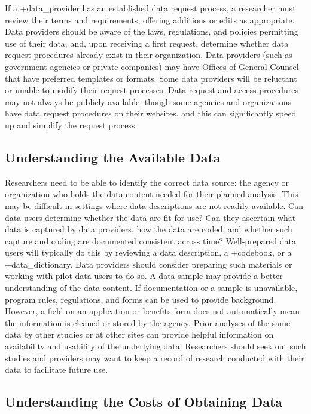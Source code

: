 \documentclass[
]{book}
\begin{document}
If a +data\_provider\textbar{} has an established data request process, a researcher must review their terms and requirements, offering additions or edits as appropriate. Data providers should be aware of the laws, regulations, and policies permitting use of their data, and, upon receiving a first request, determine whether data request procedures already exist in their organization. Data providers (such as government agencies or private companies) may have Offices of General Counsel that have preferred templates or formats. Some data providers will be reluctant or unable to modify their request processes. Data request and access procedures may not always be publicly available, though some agencies and organizations have data request procedures on their websites, and this can significantly speed up and simplify the request process.

\hypertarget{understanding-the-available-data}{%
\subsection{Understanding the Available Data}\label{understanding-the-available-data}}

Researchers need to be able to identify the correct data source: the agency or organization who holds the data content needed for their planned analysis. This may be difficult in settings where data descriptions are not readily available. Can data users determine whether the data are fit for use? Can they ascertain what data is captured by data providers, how the data are coded, and whether such capture and coding are documented consistent across time? Well-prepared data users will typically do this by reviewing a data description, a +codebook\textbar, or a +data\_dictionary\textbar. Data providers should consider preparing such materials or working with pilot data users to do so. A data sample may provide a better understanding of the data content. If documentation or a sample is unavailable, program rules, regulations, and forms can be used to provide background. However, a field on an application or benefits form does not automatically mean the information is cleaned or stored by the agency. Prior analyses of the same data by other studies or at other sites can provide helpful information on availability and usability of the underlying data. Researchers should seek out such studies and providers may want to keep a record of research conducted with their data to facilitate future use.

\hypertarget{understanding-the-costs-of-obtaining-data}{%
\subsection{Understanding the Costs of Obtaining Data}\label{understanding-the-costs-of-obtaining-data}}
\end{document}
